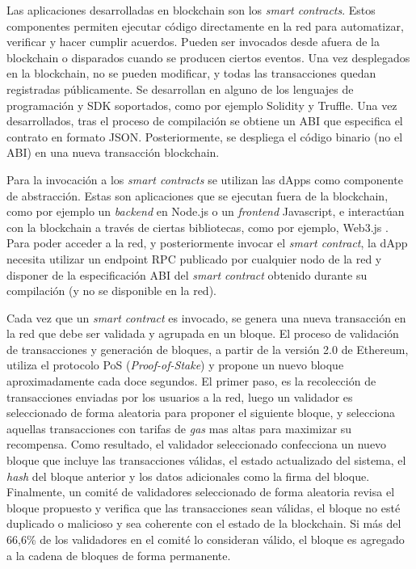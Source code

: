Las aplicaciones desarrolladas en blockchain son los \textit{smart contracts}. Estos componentes permiten ejecutar código directamente en la red para automatizar, verificar y hacer cumplir acuerdos. Pueden ser invocados desde afuera de la blockchain o disparados cuando se producen ciertos eventos. Una vez desplegados en la blockchain, no se pueden modificar, y todas las transacciones quedan registradas públicamente. 
Se desarrollan en alguno de los lenguajes de programación y SDK soportados, como por ejemplo Solidity y Truffle. Una vez desarrollados, tras el proceso de compilación se obtiene un ABI \citep{abi} que especifica el contrato en formato JSON. Posteriormente, se despliega el código binario (no el ABI) en una nueva transacción blockchain. 

Para la invocación a los \textit{smart contracts} se utilizan las dApps como componente de abstracción. Estas son aplicaciones que se ejecutan fuera de la blockchain, como por ejemplo un \textit{backend} en Node.js o un \textit{frontend} Javascript, e interactúan con la blockchain a través de ciertas bibliotecas, como por ejemplo, Web3.js \citep{web3}. Para poder acceder a la red, y posteriormente invocar el \textit{smart contract}, la dApp necesita utilizar un endpoint RPC publicado por cualquier nodo de la red y disponer de la especificación ABI del \textit{smart contract} obtenido durante su compilación (y no se disponible en la red).

Cada vez que un \textit{smart contract} es invocado, se genera una nueva transacción en la red que debe ser validada y agrupada en un bloque. El proceso de validación de transacciones y generación de bloques, a partir de la versión 2.0 de Ethereum, utiliza el protocolo PoS (\textit{Proof-of-Stake}) \citep{PoS} y propone un nuevo bloque aproximadamente cada doce segundos. El primer paso, es la recolección de transacciones enviadas por los usuarios a la red, luego un validador es seleccionado de forma aleatoria para proponer el siguiente bloque, y selecciona aquellas transacciones con tarifas de \textit{gas} mas altas para maximizar su recompensa. Como resultado, el validador seleccionado confecciona un nuevo bloque que incluye las transacciones válidas, el estado actualizado del sistema, el \textit{hash} del bloque anterior y los datos adicionales como la firma del bloque. Finalmente, un comité de validadores seleccionado de forma aleatoria revisa el bloque propuesto y verifica que las transacciones sean válidas, el bloque no esté duplicado o malicioso y sea coherente con el estado de la blockchain. Si más del 66,6\% de los validadores en el comité lo consideran válido, el bloque es agregado a la cadena de bloques de forma permanente.


